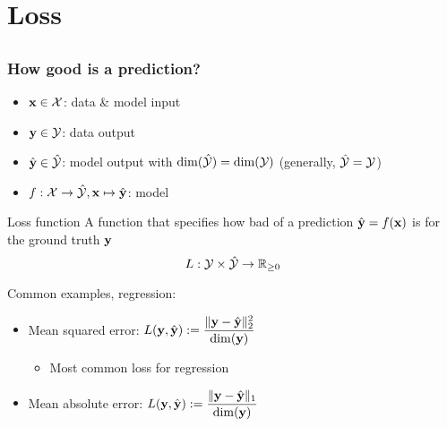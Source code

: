 \section{Loss}

\subsection{}

\begin{frame}
    \frametitle{How good is a prediction?}

    \begin{itemize}
        \item<+-> $\mathbf{x} \in \mathcal{X}$: data \& model input
        \item $\mathbf{y} \in \mathcal{Y}$: data output
        \item $\hat{\mathbf{y}} \in \hat{\mathcal{Y}}$: model output with $\dim(\hat{\mathcal{Y}}) = \dim(\mathcal{Y})$ (generally, $\hat{\mathcal{Y}} = \mathcal{Y}$)
        \item $f : \mathcal{X} \to \hat{\mathcal{Y}}, \mathbf{x} \mapsto \hat{\mathbf{y}}$: model
    \end{itemize}
    \pause

    \begin{block}{Loss function}
        A function that specifies how bad of a prediction $\hat{\mathbf{y}} = f(\mathbf{x})$ is for the ground truth $\mathbf{y}$
        \begin{equation*}
            L : \mathcal{Y} \times \hat{\mathcal{Y}} \to \mathbb{R}_{\ge 0}
        \end{equation*}
    \end{block}
    \pause

    Common examples, regression:
    \begin{itemize}
        \item \alert{Mean squared error}: $L(\mathbf{y}, \hat{\mathbf{y}}) := \dfrac{\|\mathbf{y} - \hat{\mathbf{y}}\|_2^2}{\dim(\mathbf{y})}$
        \begin{itemize}
            \item Most common loss for regression
        \end{itemize}
        \item Mean absolute error: $L(\mathbf{y}, \hat{\mathbf{y}}) := \dfrac{\|\mathbf{y} - \hat{\mathbf{y}}\|_1}{\dim(\mathbf{y})}$
    \end{itemize}
\end{frame}

